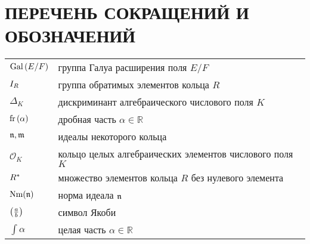 \documentclass[_00_dissertation.tex]{subfiles}
\begin{document}
\onlyinsubfile{
    \renewcommand{\contentsname}{ОГЛАВЛЕНИЕ}
    \setcounter{tocdepth}{3}
    \tableofcontents
}

\chapter*{\MakeUppercase{Перечень сокращений и обозначений}}

\begin{longtable}{p{}p{}}

    $\textrm{Gal}\left(E/F\right)$ & группа Галуа расширения поля $E/F$\\

    $I_{R}$ & группа обратимых элементов кольца $R$\\

    $\Delta_{K}$ & дискриминант алгебраического числового поля $K$\\

    $\textrm{fr}\left(\alpha\right)$ & дробная часть $\alpha \in \mathbb{R}$\\

    $\mathfrak{n}, \mathfrak{m}$ & идеалы некоторого кольца\\

    $\mathcal{O}_{K}$ & кольцо целых алгебраических элементов числового поля $K$\\

    $R^{*}$ & множество элементов кольца $R$ без нулевого элемента\\

    $\textrm{Nm}(\mathfrak{n})$ & норма идеала $\mathfrak{n}$\\

    $\left(\frac{a}{b}\right)$ & символ Якоби\\

    $\int{\alpha}$ & целая часть $\alpha \in \mathbb{R}$\\

\end{longtable}
\end{document}
